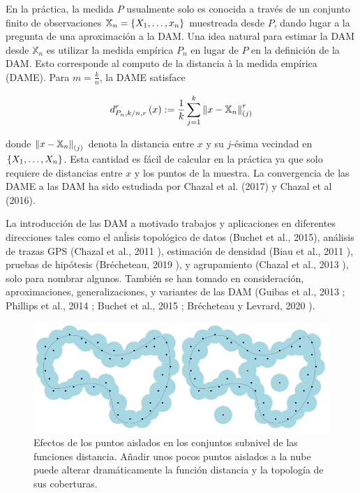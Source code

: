 \par En la pr\'actica, la medida $P$ usualmente solo es conocida a trav\'es de un conjunto finito de
observaciones $\mathbb{X}_{n}=\left\{X_{1},\dots,x_{n}\right\}$ muestreada desde $P$, dando lugar a la pregunta
de una aproximaci\'on a la DAM. Una idea natural para estimar la DAM desde $\mathbb{X}_{n}$ es utilizar
la medida emp\'irica $P_{n}$ en lugar de $P$ en la definici\'on de la DAM. Esto corresponde al computo
de la distancia à la medida emp\'irica (DAME). Para $m=\frac{k}{n}$, la DAME satisface

\begin{equation*}
    d_{P_{n},k/n,r}^{r}\left(x\right):=\frac{1}{k}\sum_{j=1}^{k}\left\|x-\mathbb{X}_{n}\right\|_{\left(j\right)}^{r}
\end{equation*}

donde $\left\|x-\mathbb{X}_{n}\right\|_{\left(j\right)}$ denota la distancia entre $x$ y su $j$-\'esima vecindad
en $\left\{X_{1},\dots,X_{n}\right\}$. Esta cantidad es f\'acil de calcular en la pr\'actica ya que solo
requiere de distancias entre $x$ y los puntos de la muestra. La convergencia de las DAME a las DAM
ha sido estudiada por Chazal et al. (2017)\cite{Chazal2017} y Chazal et al (2016)\cite{Chazal2016b}.

La introducci\'on de las DAM a motivado trabajos y aplicaciones en diferentes direcciones tales como
el an\'lisis topol\'ogico de datos (Buchet et al., 2015\cite{Buchet2015a}), an\'alisis de trazas GPS
(Chazal et al., 2011 \cite{Chazal2011a}), estimaci\'on de densidad (Biau et al., 2011 \cite{Biau2011}),
pruebas de hip\'otesis (Br\'echeteau, 2019 \cite{Brecheteau2019}), y agrupamiento (Chazal et al., 2013
\cite{Chazal2013b}), solo para nombrar algunos. Tambi\'en se han tomado en consideraci\'on,
aproximaciones, generalizaciones, y variantes de las DAM (Guibas et al., 2013 \cite{Guibas2013};
Phillips et al., 2014 \cite{Phillips2014}; Buchet et al., 2015 \cite{Buchet2015b};
Br\'echeteau y Levrard, 2020 \cite{Brecheteau2020}).

\begin{figure}[ht]
    \centering
    \includegraphics[width=0.85\linewidth]{./figures/Figura8.png}
    \caption{
        Efectos de los puntos aislados en los conjuntos subnivel de las funciones distancia. A\~{n}adir
        unos pocos puntos aislados a la nube puede alterar dram\'aticamente la funci\'on distancia y
        la topolog\'ia de sus coberturas.
    }
    \label{fig:Figura 8}
    \vspace{15pt}
\end{figure}